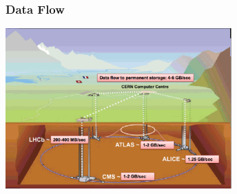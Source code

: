\documentclass[aspectratio=169]{beamer}
\begin{document}

\begin{frame}
    \frametitle{Data Flow}
    \begin{center}
        \vspace{-1em}
        \includegraphics[width=0.65\textwidth,trim=4 4 4 4,clip]
            {LHC_DataFlow.png}
    \end{center}
\end{frame}

\end{document}
